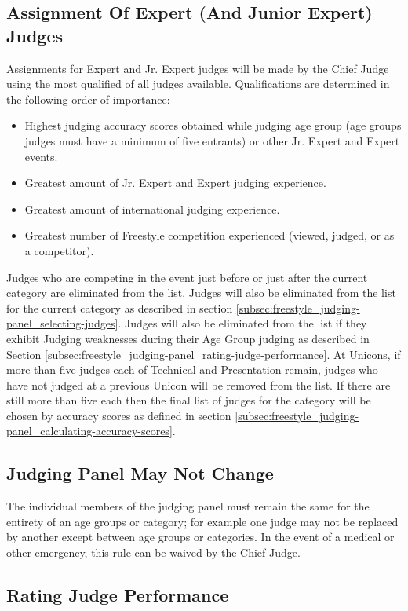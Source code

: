 \subsection{Assignment Of Expert (And Junior Expert) Judges \label{subsec:freestyle_judging-panel_assignment-of-expert-judges}}
Assignments for Expert and Jr. Expert judges will be made by the Chief Judge using the most qualified of all judges available.
Qualifications are determined in the following order of importance: 
\begin{itemize}
\item Highest judging accuracy scores obtained while judging age group (age groups judges must have a minimum of five entrants) or other Jr. Expert and Expert events.
\item Greatest amount of Jr. Expert and Expert judging experience.
\item Greatest amount of international judging experience.
\item Greatest number of Freestyle competition experienced (viewed, judged, or as a competitor).
\end{itemize}
Judges who are competing in the event just before or just after the current category are eliminated from the list.
Judges will also be eliminated from the list for the current category as described in section \ref{subsec:freestyle_judging-panel_selecting-judges}.
Judges will also be eliminated from the list if they exhibit Judging weaknesses during their Age Group judging as described in Section \ref{subsec:freestyle_judging-panel_rating-judge-performance}.
At Unicons, if more than five judges each of Technical and Presentation remain, judges who have not judged at a previous Unicon will be removed from the list.
If there are still more than five each then the final list of judges for the category will be chosen by accuracy scores as defined in section \ref{subsec:freestyle_judging-panel_calculating-accuracy-scores}.

\subsection{Judging Panel May Not Change}
The individual members of the judging panel must remain the same for the entirety of an age groups or category; for example one judge may not be replaced by another except between age groups or categories.
In the event of a medical or other emergency, this rule can be waived by the Chief Judge.

\subsection{Rating Judge Performance  \label{subsec:freestyle_judging-panel_rating-judge-performance}}


